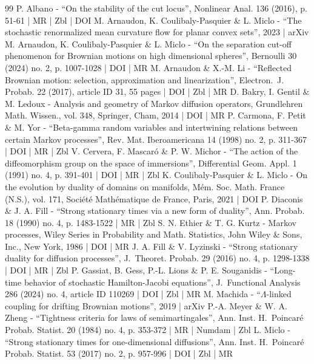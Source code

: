 \begin{thebibliography}{99}
P. Albano - “On the stability of the cut locus”, Nonlinear Anal. 136 (2016), p. 51-61 | MR | Zbl | DOI
M. Arnaudon, K. Coulibaly-Pasquier \& L. Miclo - “The stochastic renormalized mean curvature flow for planar convex sets”, 2023 | arXiv
M. Arnaudon, K. Coulibaly-Pasquier \& L. Miclo - “On the separation cut-off phenomenon for Brownian motions on high dimensional spheres”, Bernoulli 30 (2024) no. 2, p. 1007-1028 | DOI | MR
M. Arnaudon \& X.-M. Li - “Reflected Brownian motion: selection, approximation and linearization”, Electron. J. Probab. 22 (2017), article ID 31, 55 pages | DOI | Zbl | MR
D. Bakry, I. Gentil \& M. Ledoux - Analysis and geometry of Markov diffusion operators, Grundlehren Math. Wissen., vol. 348, Springer, Cham, 2014 | DOI | MR
P. Carmona, F. Petit \& M. Yor - “Beta-gamma random variables and intertwining relations between certain Markov processes”, Rev. Mat. Iberoamericana 14 (1998) no. 2, p. 311-367 | DOI | MR | Zbl
V. Cervera, F. Mascaró \& P. W. Michor - “The action of the diffeomorphism group on the space of immersions”, Differential Geom. Appl. 1 (1991) no. 4, p. 391-401 | DOI | MR | Zbl
K. Coulibaly-Pasquier \& L. Miclo - On the evolution by duality of domains on manifolds, Mém. Soc. Math. France (N.S.), vol. 171, Société Mathématique de France, Paris, 2021 | DOI
P. Diaconis \& J. A. Fill - “Strong stationary times via a new form of duality”, Ann. Probab. 18 (1990) no. 4, p. 1483-1522 | MR | Zbl
S. N. Ethier \& T. G. Kurtz - Markov processes, Wiley Series in Probability and Math. Statistics, John Wiley \& Sons, Inc., New York, 1986 | DOI | MR
J. A. Fill \& V. Lyzinski - “Strong stationary duality for diffusion processes”, J. Theoret. Probab. 29 (2016) no. 4, p. 1298-1338 | DOI | MR | Zbl
P. Gassiat, B. Gess, P.-L. Lions \& P. E. Souganidis - “Long-time behavior of stochastic Hamilton-Jacobi equations”, J. Functional Analysis 286 (2024) no. 4, article ID 110269 | DOI | Zbl | MR
M. Machida - “$\Lambda $-linked coupling for drifting Brownian motions”, 2019 | arXiv
P.-A. Meyer \& W. A. Zheng - “Tightness criteria for laws of semimartingales”, Ann. Inst. H. Poincaré Probab. Statist. 20 (1984) no. 4, p. 353-372 | MR | Numdam | Zbl
L. Miclo - “Strong stationary times for one-dimensional diffusions”, Ann. Inst. H. Poincaré Probab. Statist. 53 (2017) no. 2, p. 957-996 | DOI | Zbl | MR

\end{thebibliography}
